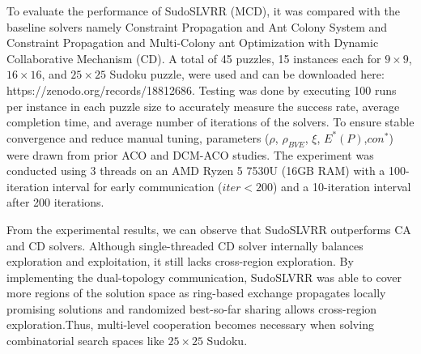 To evaluate the performance of SudoSLVRR (MCD), it was compared with the baseline solvers namely Constraint Propagation and Ant Colony System and Constraint Propagation and Multi-Colony ant Optimization with Dynamic Collaborative Mechanism (CD). A total of 45 puzzles, 15 instances each for $9\times9$, $16\times16$, and $25\times25$ Sudoku puzzle, were used and can be downloaded here: https://zenodo.org/records/18812686. Testing was done by executing 100 runs per instance in each puzzle size to accurately measure the success rate, average completion time, and average number of iterations of the solvers.  
To ensure stable convergence and reduce manual tuning, parameters ($\rho$, $\rho_{BVE}$, $\xi$, $E^*(P)$,$con^*$) were drawn from prior ACO and DCM-ACO studies. The experiment was conducted using 3 threads on an AMD Ryzen 5 7530U (16GB RAM) with a 100-iteration interval for early communication ($iter < 200$) and a 10-iteration interval after 200 iterations. 

From the experimental results, we can observe that SudoSLVRR outperforms CA and CD solvers. Although single-threaded CD solver internally balances exploration and exploitation, it still lacks cross-region exploration. By implementing the dual-topology communication, SudoSLVRR was able to cover more regions of the solution space as ring-based exchange propagates locally promising solutions and randomized best-so-far sharing allows cross-region exploration.Thus, multi-level cooperation becomes necessary when solving combinatorial search spaces like $25\times25$ Sudoku.  

